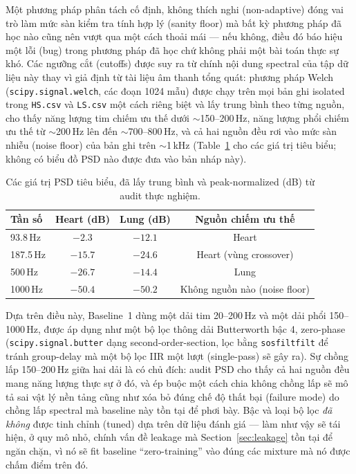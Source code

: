 \documentclass[11pt]{article}
\begin{document}
Một phương pháp phân tách cố định, không thích nghi (non-adaptive) đóng
vai trò làm mức sàn kiểm tra tính hợp lý (sanity floor) mà bất kỳ phương
pháp đã học nào cũng nên vượt qua một cách thoải mái --- nếu không, điều
đó báo hiệu một lỗi (bug) trong phương pháp đã học chứ không phải một bài
toán thực sự khó. Các ngưỡng cắt (cutoffs) được suy ra từ chính nội dung
spectral của tập dữ liệu này thay vì giả định từ tài liệu âm thanh tổng
quát: phương pháp Welch (\texttt{scipy.signal.welch}, các đoạn 1024 mẫu)
được chạy trên mọi bản ghi isolated trong \texttt{HS.csv} và
\texttt{LS.csv} một cách riêng biệt và lấy trung bình theo từng nguồn,
cho thấy năng lượng tim chiếm ưu thế dưới $\sim$150--200\,Hz, năng lượng
phổi chiếm ưu thế từ $\sim$200\,Hz lên đến $\sim$700--800\,Hz, và cả hai
nguồn đều rơi vào mức sàn nhiễu (noise floor) của bản ghi trên
$\sim$1\,kHz (Table~\ref{tab:psd} cho các giá trị tiêu biểu; không có
biểu đồ PSD nào được đưa vào bản nháp này).

\begin{table}[H]
\centering
\caption{Các giá trị PSD tiêu biểu, đã lấy trung bình và peak-normalized (dB) từ audit thực nghiệm.}
\label{tab:psd}
\begin{tabular}{@{}lccc@{}}
\toprule
Tần số & Heart (dB) & Lung (dB) & Nguồn chiếm ưu thế \\
\midrule
93.8\,Hz  & $-2.3$  & $-12.1$ & Heart \\
187.5\,Hz & $-15.7$ & $-24.6$ & Heart (vùng crossover) \\
500\,Hz   & $-26.7$ & $-14.4$ & Lung \\
1000\,Hz  & $-50.4$ & $-50.2$ & Không nguồn nào (noise floor) \\
\bottomrule
\end{tabular}
\end{table}

Dựa trên điều này, Baseline~1 dùng một dải tim 20--200\,Hz và một dải
phổi 150--1000\,Hz, được áp dụng như một bộ lọc thông dải Butterworth bậc
4, zero-phase (\texttt{scipy.signal.butter} dạng second-order-section,
lọc bằng \texttt{sosfiltfilt} để tránh group-delay mà một bộ lọc IIR một
lượt (single-pass) sẽ gây ra). Sự chồng lấp 150--200\,Hz giữa hai dải là
có chủ đích: audit PSD cho thấy cả hai nguồn đều mang năng lượng thực sự
ở đó, và ép buộc một cách chia không chồng lấp sẽ mô tả sai vật lý nền
tảng cũng như xóa bỏ đúng chế độ thất bại (failure mode) do chồng lấp
spectral mà baseline này tồn tại để phơi bày. Bậc và loại bộ lọc \emph{đã
không} được tinh chỉnh (tuned) dựa trên dữ liệu đánh giá --- làm như vậy
sẽ tái hiện, ở quy mô nhỏ, chính vấn đề leakage mà Section~\ref{sec:leakage}
tồn tại để ngăn chặn, vì nó sẽ fit baseline ``zero-training'' vào đúng các
mixture mà nó được chấm điểm trên đó.
\end{document}
